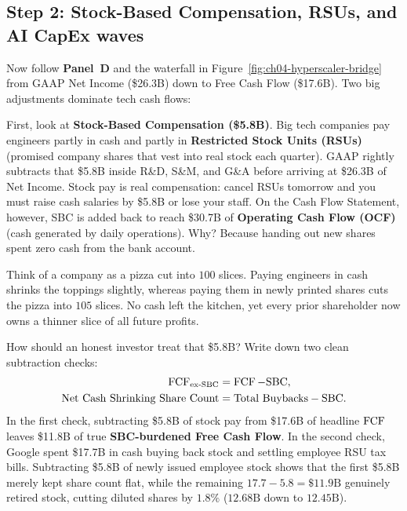 \subsection{Step 2: Stock-Based Compensation, RSUs, and AI CapEx waves}

Now follow \textbf{Panel~D} and the waterfall in Figure~\ref{fig:ch04-hyperscaler-bridge} from GAAP Net Income (\$26.3B) down to Free Cash Flow (\$17.6B). Two big adjustments dominate tech cash flows:

First, look at \textbf{Stock-Based Compensation (\$5.8B)}. Big tech companies pay engineers partly in cash and partly in \textbf{Restricted Stock Units (RSUs)} (promised company shares that vest into real stock each quarter). GAAP rightly subtracts that \$5.8B inside R\&D, S\&M, and G\&A before arriving at \$26.3B of Net Income. Stock pay is real compensation: cancel RSUs tomorrow and you must raise cash salaries by \$5.8B or lose your staff. On the Cash Flow Statement, however, SBC is added back to reach \$30.7B of \textbf{Operating Cash Flow (OCF)} (cash generated by daily operations). Why? Because handing out new shares spent zero cash from the bank account.

\begin{intuitionbox}
Think of a company as a pizza cut into $100$ slices. Paying engineers in cash shrinks the toppings slightly, whereas paying them in newly printed shares cuts the pizza into $105$ slices. No cash left the kitchen, yet every prior shareholder now owns a thinner slice of all future profits.
\end{intuitionbox}

How should an honest investor treat that \$5.8B? Write down two clean subtraction checks:
\begin{align*}
  \operatorname{FCF}_{\text{ex-SBC}} &= \operatorname{FCF} - \text{SBC}, \\
  \text{Net Cash Shrinking Share Count} &= \text{Total Buybacks} - \text{SBC}.
\end{align*}
In the first check, subtracting \$5.8B of stock pay from \$17.6B of headline $\operatorname{FCF}$ leaves \$11.8B of true \textbf{SBC-burdened Free Cash Flow}. In the second check, Google spent \$17.7B in cash buying back stock and settling employee RSU tax bills. Subtracting \$5.8B of newly issued employee stock shows that the first \$5.8B merely kept share count flat, while the remaining $17.7 - 5.8 = \$11.9\text{B}$ genuinely retired stock, cutting diluted shares by $1.8\%$ ($12.68\text{B}$ down to $12.45\text{B}$).

